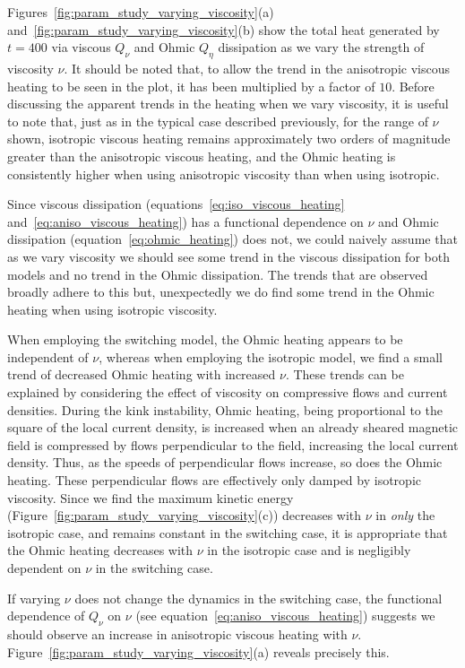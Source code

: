 Figures~\ref{fig:param_study_varying_viscosity}(a) and~\ref{fig:param_study_varying_viscosity}(b) show the total heat generated by $t=400$ via viscous $Q_{\nu}$ and Ohmic $Q_{\eta}$ dissipation as we vary the strength of viscosity $\nu$. It should be noted that, to allow the trend in the anisotropic viscous heating to be seen in the plot, it has been multiplied by a factor of $10$. Before discussing the apparent trends in the heating when we vary viscosity, it is useful to note that, just as in the typical case described previously, for the range of $\nu$ shown, isotropic viscous heating remains approximately two orders of magnitude greater than the anisotropic viscous heating, and the Ohmic heating is consistently higher when using anisotropic viscosity than when using isotropic.

Since viscous dissipation (equations~\eqref{eq:iso_viscous_heating} and~\eqref{eq:aniso_viscous_heating}) has a functional dependence on $\nu$ and Ohmic dissipation (equation~\eqref{eq:ohmic_heating}) does not, we could naively assume that as we vary viscosity we should see some trend in the viscous dissipation for both models and no trend in the Ohmic dissipation. The trends that are observed broadly adhere to this but, unexpectedly we do find some trend in the Ohmic heating when using isotropic viscosity.

When employing the switching model, the Ohmic heating appears to be independent of $\nu$, whereas when employing the isotropic model, we find a small trend of decreased Ohmic heating with increased $\nu$. These trends can be explained by considering the effect of viscosity on compressive flows and current densities. During the kink instability, Ohmic heating, being proportional to the square of the local current density, is increased when an already sheared magnetic field is compressed by flows perpendicular to the field, increasing the local current density. Thus, as the speeds of perpendicular flows increase, so does the Ohmic heating. These perpendicular flows are effectively only damped by isotropic viscosity. Since we find the maximum kinetic energy (Figure~\ref{fig:param_study_varying_viscosity}(c)) decreases with $\nu$ in \emph{only} the isotropic case, and remains constant in the switching case, it is appropriate that the Ohmic heating decreases with $\nu$ in the isotropic case and is negligibly dependent on $\nu$ in the switching case.

If varying $\nu$ does not change the dynamics in the switching case, the functional dependence of $Q_{\nu}$ on $\nu$ (see equation~\eqref{eq:aniso_viscous_heating}) suggests we should observe an increase in anisotropic viscous heating with $\nu$. Figure~\ref{fig:param_study_varying_viscosity}(a) reveals precisely this.


